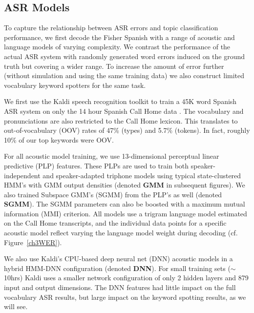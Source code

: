 \subsection{ASR Models}

To capture the relationship between ASR errors and topic classification performance, we first decode the Fisher Spanish with a range of acoustic and language models of varying complexity.  We contrast the performance of the actual ASR system with randomly generated word errors induced on the ground truth but covering a wider range.  To increase the amount of error further (without simulation and using the same training data) we also construct limited vocabulary keyword spotters for the same task.

We first use the Kaldi speech recognition toolkit \cite{kaldi} to train a 45K word Spanish ASR system on only the 14 hour Spanish Call Home data \cite{callhome}.  The vocabulary and pronunciations are also restricted to the Call Home lexicon.  This translates to out-of-vocabulary (OOV) rates of 47\% (types) and 5.7\% (tokens). In fact, roughly 10\% of our top keywords were OOV.

For all acoustic model training, we use 13-dimensional perceptual linear predictive (PLP) features.  These PLPs are used to train both speaker-independent and speaker-adapted triphone models using typical state-clustered HMM's with GMM output densities (denoted \textbf{GMM} in subsequent figures).  We also trained Subspace GMM's \cite{povey2010} (SGMM) from the PLP's as well (denoted \textbf{SGMM}).  The SGMM parameters can also be boosted with a maximum mutual information (MMI) criterion.  All models use a trigram language model estimated on the Call Home transcripts, and the individual data points for a specific acoustic model reflect varying the language model weight during decoding (cf. Figure~\ref{ch3WER}).

We also use Kaldi's CPU-based deep neural net (DNN) acoustic models in a hybrid HMM-DNN configuration \cite{vesely2013} (denoted \textbf{DNN}).  For small training sets ($\sim$10hrs) Kaldi uses a smaller network configuration of only 2 hidden layers and 879 input and output dimensions.  The DNN features had little impact on the full vocabulary ASR results, but large impact on the keyword spotting results, as we will see.

